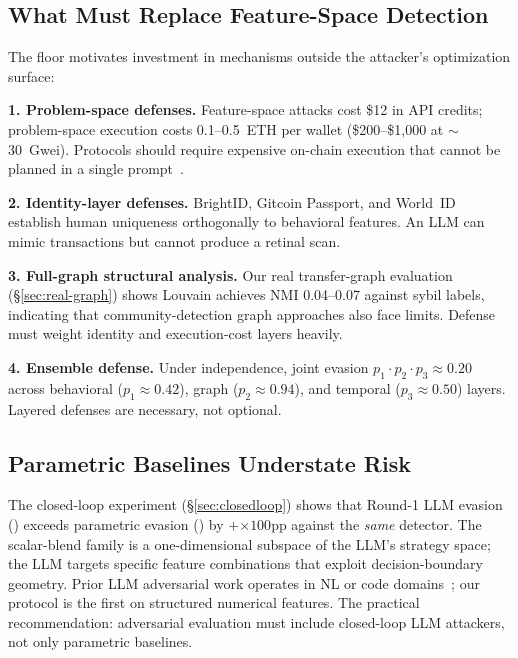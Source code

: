 \documentclass[sigconf,nonacm=false]{acmart}
\begin{document}
\subsection{What Must Replace Feature-Space Detection}

The \bestResponseAucFloorMean{} floor motivates investment in mechanisms outside the attacker's optimization surface:

\noindent\textbf{1. Problem-space defenses.}
Feature-space attacks cost \$12 in API credits; problem-space execution costs 0.1--0.5~ETH per wallet (\$200--\$1,000 at ${\sim}$30~Gwei). Protocols should require expensive on-chain execution that cannot be planned in a single prompt~\cite{pierazzi2020}.

\noindent\textbf{2. Identity-layer defenses.}
BrightID, Gitcoin Passport, and World~ID establish human uniqueness orthogonally to behavioral features. An LLM can mimic transactions but cannot produce a retinal scan.

\noindent\textbf{3. Full-graph structural analysis.}
Our real transfer-graph evaluation (\S\ref{sec:real-graph}) shows Louvain achieves NMI 0.04--0.07 against sybil labels, indicating that community-detection graph approaches also face limits. Defense must weight identity and execution-cost layers heavily.

\noindent\textbf{4. Ensemble defense.}
Under independence, joint evasion $p_1 \cdot p_2 \cdot p_3 \approx 0.20$ across behavioral ($p_1{\approx}0.42$), graph ($p_2{\approx}0.94$), and temporal ($p_3{\approx}0.50$) layers. Layered defenses are necessary, not optional.

\subsection{Parametric Baselines Understate Risk}

The closed-loop experiment (\S\ref{sec:closedloop}) shows that Round-1 LLM evasion (\closedLoopRoundLlmEvasionMean{}) exceeds parametric evasion (\closedLoopRoundParametricEvasionMean{}) by $+$\closedLoopRoundEvasionDelta{}$\times 100$pp against the \emph{same} detector.
The scalar-blend family is a one-dimensional subspace of the LLM's strategy space; the LLM targets specific feature combinations that exploit decision-boundary geometry. Prior LLM adversarial work operates in NL or code domains~\cite{chao2023jailbreaking,deng2024llm_pentesting}; our protocol is the first on structured numerical features. The practical recommendation: adversarial evaluation must include closed-loop LLM attackers, not only parametric baselines.
\end{document}
